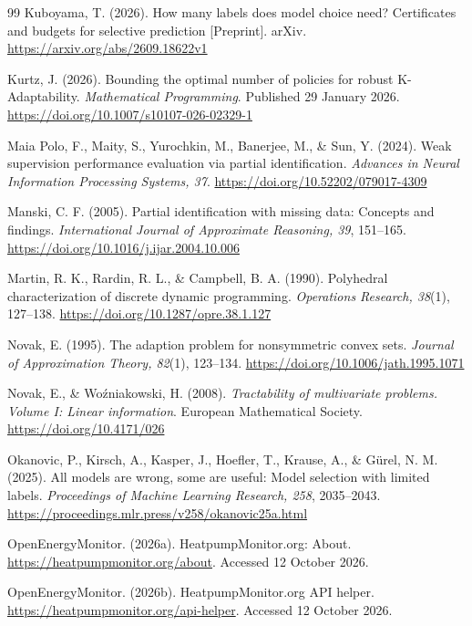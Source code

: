 \documentclass[12pt]{article}
\begin{document}
\begin{thebibliography}{99}
Kuboyama, T. (2026).
How many labels does model choice need? Certificates and budgets for selective
prediction [Preprint].
arXiv. \url{https://arxiv.org/abs/2609.18622v1}

Kurtz, J. (2026). Bounding the optimal number of policies for robust
K-Adaptability. \emph{Mathematical Programming}. Published 29 January 2026.
\url{https://doi.org/10.1007/s10107-026-02329-1}

Maia Polo, F., Maity, S., Yurochkin, M., Banerjee, M., \& Sun, Y. (2024).
Weak supervision performance evaluation via partial identification.
\emph{Advances in Neural Information Processing Systems, 37}.
\url{https://doi.org/10.52202/079017-4309}

Manski, C. F. (2005). Partial identification with missing data:
Concepts and findings. \emph{International Journal of Approximate
Reasoning, 39}, 151--165.
\url{https://doi.org/10.1016/j.ijar.2004.10.006}

Martin, R. K., Rardin, R. L., \& Campbell, B. A. (1990).
Polyhedral characterization of discrete dynamic programming.
\emph{Operations Research, 38}(1), 127--138.
\url{https://doi.org/10.1287/opre.38.1.127}

Novak, E. (1995). The adaption problem for nonsymmetric convex sets.
\emph{Journal of Approximation Theory, 82}(1), 123--134.
\url{https://doi.org/10.1006/jath.1995.1071}

Novak, E., \& Wo{\'z}niakowski, H. (2008).
\emph{Tractability of multivariate problems. Volume I: Linear information}.
European Mathematical Society.
\url{https://doi.org/10.4171/026}

Okanovic, P., Kirsch, A., Kasper, J., Hoefler, T., Krause, A., \&
G\"urel, N. M. (2025). All models are wrong, some are useful:
Model selection with limited labels.
\emph{Proceedings of Machine Learning Research, 258}, 2035--2043.
\url{https://proceedings.mlr.press/v258/okanovic25a.html}

OpenEnergyMonitor. (2026a). HeatpumpMonitor.org: About.
\url{https://heatpumpmonitor.org/about}. Accessed 12 October 2026.

OpenEnergyMonitor. (2026b). HeatpumpMonitor.org API helper.
\url{https://heatpumpmonitor.org/api-helper}. Accessed 12 October 2026.


\end{thebibliography}
\end{document}

